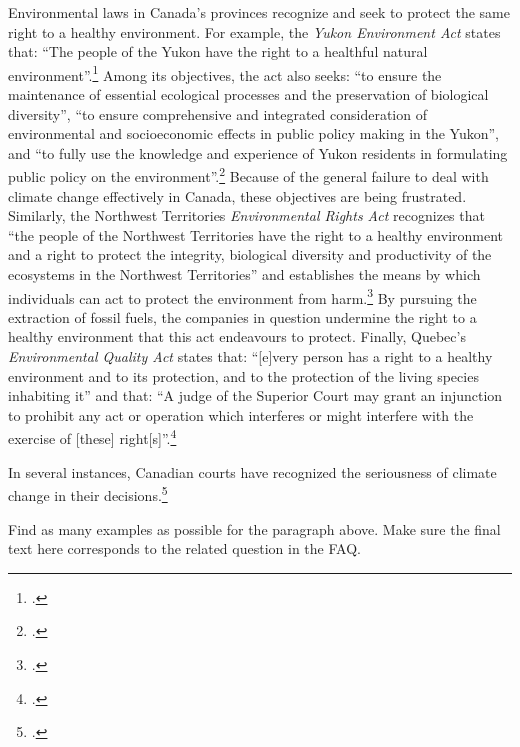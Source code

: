 Environmental laws in Canada's provinces recognize and seek to protect the same right to a healthy environment.  
For example, the \emph{Yukon Environment Act} states that: ``The people of the Yukon have the right to a healthful natural environment''.\footcite[][p. 14]{YukonEnvAct}
Among its objectives, the act also seeks: ``to ensure the maintenance of essential ecological processes and the preservation of biological diversity'', ``to ensure comprehensive and integrated consideration of environmental and socioeconomic effects in public policy making in the Yukon'', and ``to fully use the knowledge and experience of Yukon residents in formulating public policy on the environment''.\footcite[][p. 13]{YukonEnvAct}
Because of the general failure to deal with climate change effectively in Canada, these objectives are being frustrated.
Similarly, the Northwest Territories \emph{Environmental Rights Act} recognizes that ``the people of the Northwest Territories have the right to a healthy environment and a right to protect the integrity, biological diversity and productivity of the ecosystems in the Northwest Territories'' and establishes the means by which individuals can act to protect the environment from harm.\footcite[][]{NWTEnvRightsAct}
By pursuing the extraction of fossil fuels, the companies in question undermine the right to a healthy environment that this act endeavours to protect. 
Finally, Quebec's \emph{Environmental Quality Act} states that: ``[e]very person has a right to a healthy environment and to its protection, and to the protection of the living species inhabiting it'' and that: ``A judge of the Superior Court may grant an injunction to prohibit any act or operation which interferes or might interfere with the exercise of [these] right[s]''.\footcite[][]{QuebecEQA}



In several instances, Canadian courts have recognized the seriousness of climate change in their decisions.\footcite[For a summary of the history of judicial interpretation of the powers of the federal and provincial governments concerning environmental protection, see Chapter 3 of: ][]{Harrison1996}

\begin{vcom}
Find as many examples as possible for the paragraph above. Make sure the final text here corresponds to the related question in the FAQ.
\end{vcom}


